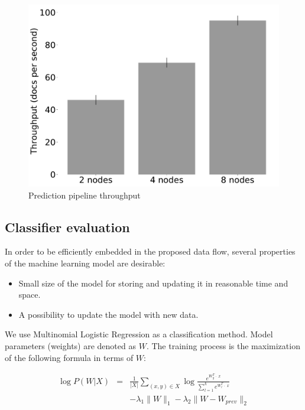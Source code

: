 \begin{figure}[htbp]
  \centering
  \includegraphics[scale=0.20]{pics/classifier_throughput}
  \caption{Prediction pipeline throughput}
  \label {throughput}
\end{figure}

\subsection{Classifier evaluation}

In order to be efficiently embedded in the proposed data flow, several properties of the machine learning model are desirable:
\begin{itemize}
     \item Small size of the model for storing and updating it in reasonable time and space.
     \item A possibility to update the model with new data.
\end{itemize}

We use Multinomial Logistic Regression as a classification method. Model parameters (weights) are denoted as $W$. The training process is the maximization of the following formula in terms of $W$:

$$ 
\begin{array}{rcl}
\log P(W | X)   & = &
 \frac 
      {1}{|X|} \sum \limits_{(x, y) \in X} \log \frac{e^{{W_y^T \cdot \; x}}}
      {\sum \limits_{l = 1}^{k}  e^{{W_{l}^T \cdot \; x}}}                  \\
  & & - \lambda_1 \parallel  W\parallel _1 
   - \lambda_2 \parallel  W - W_{prev} \parallel _2 
   \end {array}
   $$ 

